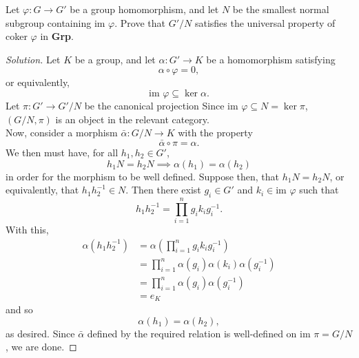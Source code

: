 \documentclass[12pt]{article}
\newenvironment{problem}[2][Problem]{\begin{trivlist}
\item[\hskip \labelsep {\bfseries #1}\hskip \labelsep {\bfseries #2.}]}{\end{trivlist}}
\newcommand{\catname}[1]{\normalfont\textbf{#1}}
\newcommand{\im}{\text{im }}
\newenvironment{solution}
  {\renewcommand\qedsymbol{$\blacksquare$}\begin{proof}[Solution]}
{\end{proof}}
\theoremstyle{remark}
\begin{document}
\begin{problem}{8.22}
  Let $\varphi:G\to G'$ be a group homomorphism, and 
  let $N$ be the smallest normal subgroup containing $\im\varphi$.
  Prove that $G'/N$ satisfies the universal property of coker $\varphi$ in \catname{Grp}.
\end{problem}
\begin{solution}
  Let $K$ be a group, and let $\alpha:G'\to K$ be a homomorphism satisfying
  \begin{equation*}
    \alpha\circ\varphi = 0,
  \end{equation*}
  or equivalently,
  \begin{equation*}
    \im\varphi\subseteq\ker\alpha.
  \end{equation*}
  Let $\pi:G'\to G'/N$ be the canonical projection
  Since $\im\varphi\subseteq N=\ker\pi$, $(G/N, \pi)$ is an object in the relevant category.\\
  Now, consider a morphism $\bar\alpha:G/N\to K$ with the property
  \begin{equation*}
    \bar\alpha\circ\pi=\alpha.
  \end{equation*}
  We then must have, for all $h_1,h_2\in G'$,
  \begin{equation*}
    h_1N=h_2N \implies \alpha(h_1)=\alpha(h_2)
  \end{equation*}
  in order for the morphism to be well defined.
  Suppose then, that $h_1N=h_2N$, or equivalently, that $h_1h_2^{-1}\in N$.
  Then there exist $g_i\in G'$ and $k_i\in\im\varphi$ such that
  \begin{equation*}
    h_1h_2^{-1}=\prod_{i=1}^{n} g_ik_ig_i^{-1}.
  \end{equation*}
  With this,
  \begin{align*}
    \alpha(h_1h_2^{-1}) &= \alpha\left(\prod_{i=1}^{n} g_ik_ig_i^{-1}\right) \\
    &= \prod_{i=1}^{n} \alpha(g_i)\alpha(k_i)\alpha(g_i^{-1}) \\
    &= \prod_{i=1}^{n} \alpha(g_i)\alpha(g_i^{-1}) \\
    &= e_K
  \end{align*}
  and so
  \begin{equation*}
    \alpha(h_1)=\alpha(h_2),
  \end{equation*}
  as desired.
  Since $\bar\alpha$ defined by the required relation is well-defined on $\im\pi = G/N$, we are done.
\end{solution}
\end{document}

